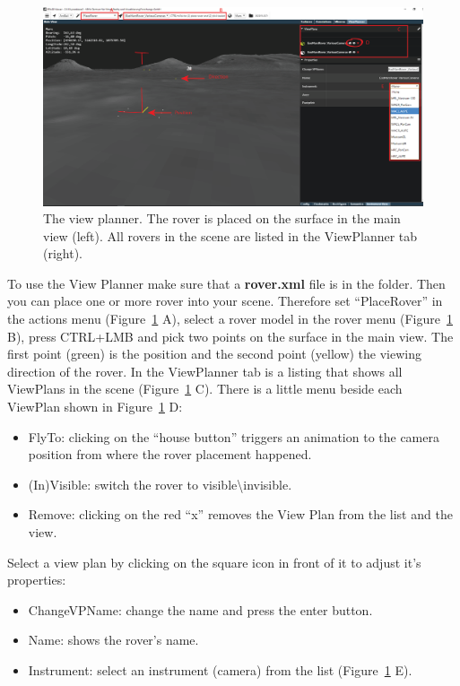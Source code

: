 \begin{figure}[h]
    	\centering
    		\includegraphics[width=1\textwidth]{pics/ViewPlanner1.png}
    	\caption[View Planner]{The view planner. The rover is placed on the surface in the main view (left). All rovers in the scene are listed in the ViewPlanner tab (right).}
    	\label{fig:viewPlanner}
   \end{figure}
To use the View Planner make sure that a \textbf{rover.xml} file is in the \textbf{} folder. Then you can place one or more rover into your scene.
Therefore set ``PlaceRover'' in the actions menu (Figure~\ref{fig:viewPlanner} A), select a rover model in the rover menu (Figure~\ref{fig:viewPlanner} B), press CTRL+LMB and pick two points on the surface in the main view. The first point (green) is the position and the second point (yellow) the viewing direction of the rover. In the ViewPlanner tab is a listing that shows all ViewPlans in the scene (Figure~\ref{fig:viewPlanner} C). There is a little menu beside each ViewPlan shown in Figure~\ref{fig:viewPlanner} D:
\begin{itemize}
	\item FlyTo: clicking on the ``house button'' triggers an animation to the camera position from where the rover placement happened.
	\item (In)Visible: switch the rover to visible\textbackslash invisible.
	\item Remove: clicking on the red ``x'' removes the View Plan from the list and the view.
\end{itemize}
Select a view plan by clicking on the square icon in front of it to adjust it's properties:
\begin{itemize}
	\item ChangeVPName: change the name and press the enter button.
	\item Name: shows the rover's name.
	\item Instrument: select an instrument (camera) from the list (Figure~\ref{fig:viewPlanner} E).
\end{itemize}
